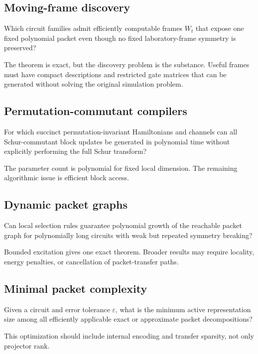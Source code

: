\subsection{Moving-frame discovery}
\begin{question}
Which circuit families admit efficiently computable frames \(W_t\) that expose one fixed polynomial packet even though no fixed laboratory-frame symmetry is preserved?
\end{question}
The theorem is exact, but the discovery problem is the substance. Useful frames must have compact descriptions and restricted gate matrices that can be generated without solving the original simulation problem.

\subsection{Permutation-commutant compilers}
\begin{question}
For which succinct permutation-invariant Hamiltonians and channels can all Schur-commutant block updates be generated in polynomial time without explicitly performing the full Schur transform?
\end{question}
The parameter count is polynomial for fixed local dimension. The remaining algorithmic issue is efficient block access.

\subsection{Dynamic packet graphs}
\begin{question}
Can local selection rules guarantee polynomial growth of the reachable packet graph for polynomially long circuits with weak but repeated symmetry breaking?
\end{question}
Bounded excitation gives one exact theorem. Broader results may require locality, energy penalties, or cancellation of packet-transfer paths.

\subsection{Minimal packet complexity}
\begin{question}
Given a circuit and error tolerance $\varepsilon$, what is the minimum active representation size among all efficiently applicable exact or approximate packet decompositions?
\end{question}
This optimization should include internal encoding and transfer sparsity, not only projector rank.

